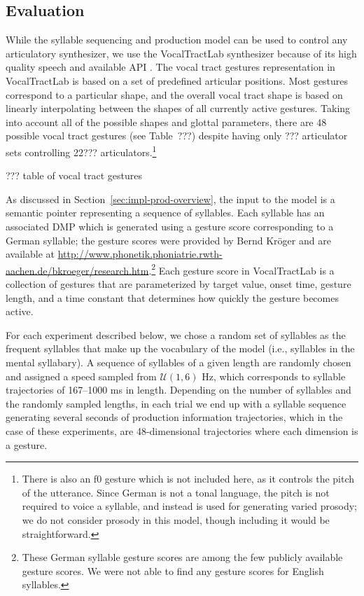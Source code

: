 \subsection{Evaluation}

While the syllable sequencing and production model
can be used to control any articulatory synthesizer,
we use the VocalTractLab synthesizer
because of its high quality speech
and available API \cite{birkholz2013}.
The vocal tract gestures representation
in VocalTractLab is based on a set of
predefined articular positions.
Most gestures correspond to
a particular shape,
and the overall vocal tract shape
is based on linearly interpolating
between the shapes of
all currently active gestures.
Taking into account all of the
possible shapes and glottal parameters,
there are 48 possible vocal tract gestures
(see Table~???) despite having only
??? articulator sets
controlling 22??? articulators.\footnote{
  There is also an f0 gesture which is not included here,
  as it controls the pitch of the utterance.
  Since German is not a tonal language,
  the pitch is not required to voice a syllable,
  and instead is used for generating
  varied prosody;
  we do not consider prosody in this model,
  though including it would be straightforward.}

??? table of vocal tract gestures

As discussed in Section~\ref{sec:impl-prod-overview},
the input to the model
is a semantic pointer
representing a sequence of syllables.
Each syllable has an associated DMP
which is generated using
a gesture score corresponding to
a German syllable;
the gesture scores were provided by
Bernd Kr\"{o}ger and are available at
\url{http://www.phonetik.phoniatrie.rwth-aachen.de/bkroeger/research.htm}.\footnote{
  These German syllable gesture scores are among
  the few publicly available gesture scores.
  We were not able to find any gesture scores
  for English syllables.}
Each gesture score in VocalTractLab
is a collection of
gestures that are parameterized by target value,
onset time, gesture length,
and a time constant that determines
how quickly the gesture becomes active.

For each experiment described below,
we chose a random set of syllables
as the frequent syllables
that make up the vocabulary
of the model
(i.e., syllables in the mental syllabary).
A sequence of syllables of a given length
are randomly chosen and assigned a speed
sampled from $\mathcal{U}(1, 6)$ Hz,
which corresponds to syllable trajectories of
167--1000 ms in length.
Depending on the number of syllables
and the randomly sampled lengths,
in each trial we end up with a syllable sequence
generating several seconds
of production information trajectories,
which in the case of these experiments,
are 48-dimensional trajectories
where each dimension is a gesture.

